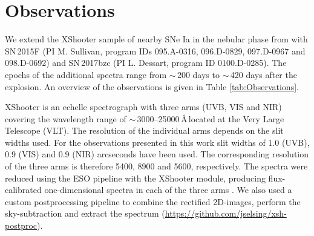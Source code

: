 \documentclass[fleqn,usenatbib]{mnras}
\begin{document}
\section{Observations}
\label{SectionObservations}
We extend the XShooter sample of nearby SNe Ia in the nebular phase from \citet{2018MNRAS.477.3567M} with SN\,2015F (PI M. Sullivan, program IDs 095.A-0316, 096.D-0829, 097.D-0967 and 098.D-0692) and SN\,2017bzc (PI L. Dessart, program ID 0100.D-0285). The epochs of the additional spectra range from $\sim$\,200 days to $\sim$\,420 days after the explosion. An overview of the observations is given in Table \ref{tab:Observations}.

XShooter is an echelle spectrograph with three arms (UVB, VIS and NIR) covering the wavelength range of $\sim$\,3000--25000\,\AA\,located at the Very Large Telescope (VLT). The resolution of the individual arms depends on the slit widths used. For the observations presented in this work slit widths of 1.0 (UVB), 0.9 (VIS) and 0.9 (NIR) arcseconds have been used. The corresponding resolution of the three arms is therefore 5400, 8900 and 5600, respectively. The spectra were reduced using the ESO pipeline with the XShooter module, producing flux-calibrated one-dimensional spectra in each of the three arms \citep{2010SPIE.7737E..28M,2013A&A...559A..96F}. We also used a custom postprocessing pipeline to combine the rectified 2D-images, perform the sky-subtraction and extract the spectrum (\url{https://github.com/jselsing/xsh-postproc}).
\end{document}
